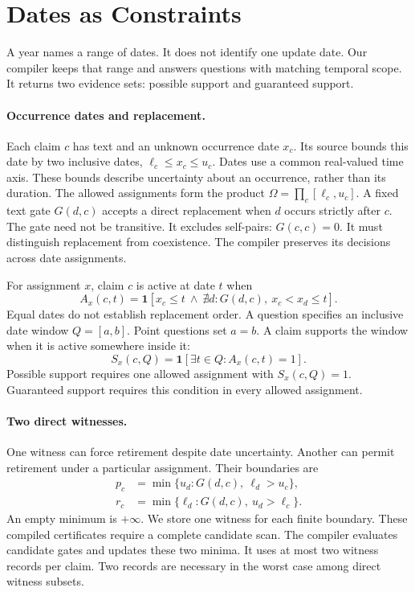 \section{Dates as Constraints}
\label{sec:theory}

A year names a range of dates.
It does not identify one update date.
Our compiler keeps that range and answers questions with matching temporal scope.
It returns two evidence sets: possible support and guaranteed support.

\paragraph{Occurrence dates and replacement.}
Each claim $c$ has text and an unknown occurrence date $x_c$.
Its source bounds this date by two inclusive dates, $\ell_c\leq x_c\leq u_c$.
Dates use a common real-valued time axis.
These bounds describe uncertainty about an occurrence, rather than its duration.
The allowed assignments form the product
$\Omega=\prod_c[\ell_c,u_c]$.
A fixed text gate $G(d,c)$ accepts a direct replacement when $d$ occurs strictly after $c$.
The gate need not be transitive.
It excludes self-pairs: $G(c,c)=0$.
It must distinguish replacement from coexistence.
The compiler preserves its decisions across date assignments.

For assignment $x$, claim $c$ is active at date $t$ when
\begin{equation}
 A_x(c,t)=\mathbf{1}\!\left[
 x_c\leq t\ \land\ \nexists d:
 G(d,c),\ x_c<x_d\leq t
 \right].
\label{eq:uncertain-active}
\end{equation}
Equal dates do not establish replacement order.
A question specifies an inclusive date window $Q=[a,b]$.
Point questions set $a=b$.
A claim supports the window when it is active somewhere inside it:
\begin{equation}
 S_x(c,Q)=\mathbf{1}[\exists t\in Q:A_x(c,t)=1].
\end{equation}
Possible support requires one allowed assignment with $S_x(c,Q)=1$.
Guaranteed support requires this condition in every allowed assignment.

\paragraph{Two direct witnesses.}
One witness can force retirement despite date uncertainty.
Another can permit retirement under a particular assignment.
Their boundaries are
\begin{align}
 p_c&=\min\{u_d:G(d,c),\ \ell_d>u_c\},\label{eq:possible-boundary}\\
 r_c&=\min\{\ell_d:G(d,c),\ u_d>\ell_c\}.\label{eq:certain-boundary}
\end{align}
An empty minimum is $+\infty$.
We store one witness for each finite boundary.
These compiled certificates require a complete candidate scan.
The compiler evaluates candidate gates and updates these two minima.
It uses at most two witness records per claim.
Two records are necessary in the worst case among direct witness subsets.

